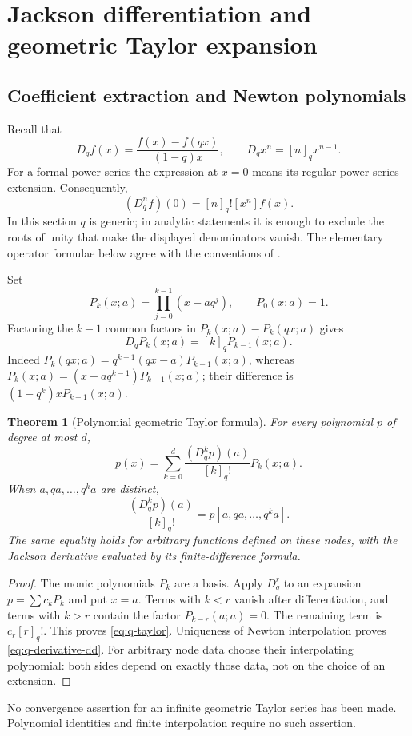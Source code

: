\documentclass[11pt,a4paper]{article}
\numberwithin{equation}{section}
\newtheorem{theorem}{Theorem}[section]
\theoremstyle{definition}
\theoremstyle{remark}
\newcommand{\qnum}[1]{[#1]_q}
\newcommand{\qfac}[1]{[#1]_q!}
\newcommand{\coef}[2]{[#1^{#2}]}
\newcommand{\Dq}{D_q}
\begin{document}
\section{Jackson differentiation and geometric Taylor expansion}
\label{sec:jackson}

\subsection{Coefficient extraction and Newton polynomials}
Recall that
\[
 \Dq f(x)=\frac{f(x)-f(qx)}{(1-q)x},\qquad
 \Dq x^n=\qnum n x^{n-1}.
\]
For a formal power series the expression at $x=0$ means its regular
power-series extension. Consequently,
\begin{equation}
 (\Dq^n f)(0)=\qfac n\coef xn f(x).
 \label{eq:q-coef-extraction}
\end{equation}
In this section $q$ is generic; in analytic statements it is enough to
exclude the roots of unity that make the displayed denominators vanish.
The elementary operator formulae below agree with the conventions of
\cite[\S17.2(iv)]{dlmf17}.

Set
\[
 P_k(x;a)=\prod_{j=0}^{k-1}(x-aq^j),\qquad P_0(x;a)=1.
\]
Factoring the $k-1$ common factors in $P_k(x;a)-P_k(qx;a)$ gives
\begin{equation}
 \Dq P_k(x;a)=\qnum k P_{k-1}(x;a).
 \label{eq:q-factorial-lowering}
\end{equation}
Indeed $P_k(qx;a)=q^{k-1}(qx-a)P_{k-1}(x;a)$, whereas
$P_k(x;a)=(x-aq^{k-1})P_{k-1}(x;a)$; their difference is
$(1-q^k)xP_{k-1}(x;a)$.

\begin{theorem}[Polynomial geometric Taylor formula]
For every polynomial $p$ of degree at most $d$,
\begin{equation}
 p(x)=\sum_{k=0}^{d}
       \frac{(\Dq^k p)(a)}{\qfac k}P_k(x;a).
 \label{eq:q-taylor}
\end{equation}
When $a,qa,\ldots,q^ka$ are distinct,
\begin{equation}
 \frac{(\Dq^k p)(a)}{\qfac k}=p[a,qa,\ldots,q^ka].
 \label{eq:q-derivative-dd}
\end{equation}
The same equality holds for arbitrary functions defined on these nodes,
with the Jackson derivative evaluated by its finite-difference formula.
\end{theorem}
\begin{proof}
The monic polynomials $P_k$ are a basis. Apply $\Dq^r$ to an expansion
$p=\sum c_kP_k$ and put $x=a$. Terms with $k<r$ vanish after
differentiation, and terms with $k>r$ contain the factor $P_{k-r}(a;a)=0$.
The remaining term is $c_r\qfac r$. This proves \cref{eq:q-taylor}.
Uniqueness of Newton interpolation proves \cref{eq:q-derivative-dd}.
For arbitrary node data choose their interpolating polynomial: both sides
depend on exactly those data, not on the choice of an extension.
\end{proof}
No convergence assertion for an infinite geometric Taylor series has been
made. Polynomial identities and finite interpolation require no such
assertion.
\end{document}
